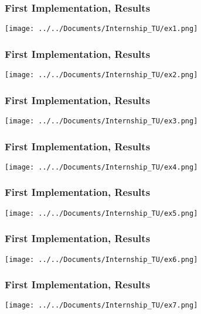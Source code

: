 \documentclass{beamer}
\begin{document}


\begin{frame}
\frametitle{First Implementation, Results}

\texttt{[image: ../../Documents/Internship\_TU/ex1.png]} 

\end{frame}


\begin{frame}
\frametitle{First Implementation, Results}

\texttt{[image: ../../Documents/Internship\_TU/ex2.png]} 

\end{frame}


\begin{frame}
\frametitle{First Implementation, Results}

\texttt{[image: ../../Documents/Internship\_TU/ex3.png]} 

\end{frame}


\begin{frame}
\frametitle{First Implementation, Results}

\texttt{[image: ../../Documents/Internship\_TU/ex4.png]} 

\end{frame}


\begin{frame}
\frametitle{First Implementation, Results}

\texttt{[image: ../../Documents/Internship\_TU/ex5.png]} 

\end{frame}

\begin{frame}
\frametitle{First Implementation, Results}

\texttt{[image: ../../Documents/Internship\_TU/ex6.png]} 

\end{frame}


\begin{frame}
\frametitle{First Implementation, Results}

\texttt{[image: ../../Documents/Internship\_TU/ex7.png]} 

\end{frame}
\end{document}
